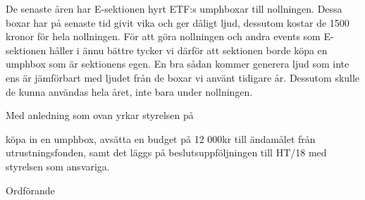 \documentclass[../_main/handlingar.tex]{subfiles}
\begin{document}

De senaste åren har E-sektionen hyrt ETF:s umphboxar till nollningen. Dessa boxar har på senaste tid givit vika och ger dåligt ljud, dessutom kostar de 1500 kronor för hela nollningen. För att göra nollningen och andra events som E-sektionen håller i ännu bättre tycker vi därför att sektionen borde köpa en umphbox som är sektionens egen. En bra sådan kommer generera ljud som inte ens är jämförbart med ljudet från de boxar vi använt tidigare år. Dessutom skulle de kunna användas hela året, inte bara under nollningen.

Med anledning som ovan yrkar styrelsen på

\begin{attsatser}
    \att köpa in en umphbox,
    \att avsätta en budget på 12 000kr till ändamålet från utrustningsfonden, samt
    \att det läggs på beslutsuppföljningen till HT/18 med styrelsen som ansvariga.
\end{attsatser}

\begin{signatures}{1}
    \ist
    \signature{\ordf}{Ordförande}
\end{signatures}
\end{document}
